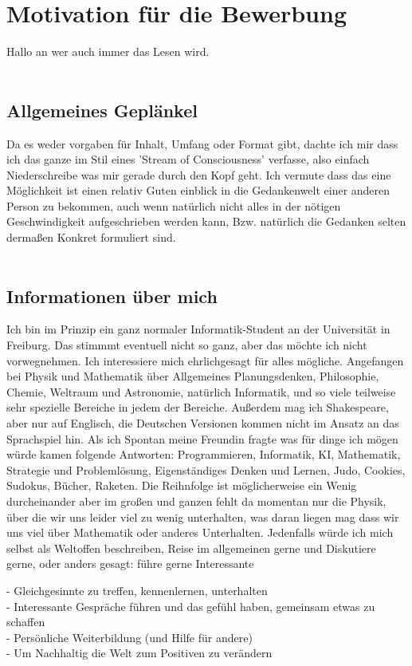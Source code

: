 \documentclass{scrartcl}
\begin{document}
\section*{Motivation für die Bewerbung}

Hallo an wer auch immer das Lesen wird. \\ \\


\subsection*{Allgemeines Geplänkel}

Da es weder vorgaben für Inhalt, Umfang oder Format gibt, dachte ich mir dass ich das ganze
im Stil eines 'Stream of Consciousness' verfasse, also einfach Niederschreibe was mir gerade
durch den Kopf geht. Ich vermute dass das eine Möglichkeit ist einen relativ Guten einblick
in die Gedankenwelt einer anderen Person zu bekommen, auch wenn natürlich nicht alles in der
nötigen Geschwindigkeit aufgeschrieben werden kann, Bzw. natürlich die Gedanken selten dermaßen
Konkret formuliert sind.  \\ \\


\subsection*{Informationen über mich}

Ich bin im Prinzip ein ganz normaler Informatik-Student an der Universität in Freiburg. Das
stimmmt eventuell nicht so ganz, aber das möchte ich nicht vorwegnehmen. Ich interessiere mich
ehrlichgesagt für alles mögliche. Angefangen bei Physik und Mathematik über Allgemeines
Planungsdenken, Philosophie, Chemie, Weltraum und Astronomie, natürlich Informatik, und
so viele teilweise sehr spezielle Bereiche in jedem der Bereiche. Außerdem mag ich Shakespeare,
aber nur auf Englisch, die Deutschen Versionen kommen nicht im Ansatz an das Sprachspiel hin.
Als ich Spontan meine Freundin fragte was für dinge ich mögen würde kamen folgende Antworten:
Programmieren, Informatik, KI, Mathematik, Strategie und Problemlösung, Eigenständiges Denken und Lernen,
Judo, Cookies, Sudokus, Bücher, Raketen. Die Reihnfolge ist möglicherweise ein Wenig durcheinander
aber im großen und ganzen fehlt da momentan nur die Physik, über die wir uns leider viel zu wenig
unterhalten, was daran liegen mag dass wir uns viel über Mathematik oder anderes Unterhalten.
Jedenfalls würde ich mich selbst als Weltoffen beschreiben, Reise im allgemeinen gerne
und Diskutiere gerne, oder anders gesagt: führe gerne Interessante 



- Gleichgesinnte zu treffen, kennenlernen, unterhalten \\
- Interessante Gespräche führen und das gefühl haben, gemeinsam etwas zu schaffen \\
- Persönliche Weiterbildung (und Hilfe für andere) \\
- Um Nachhaltig die Welt zum Positiven zu verändern \\
\end{document}
